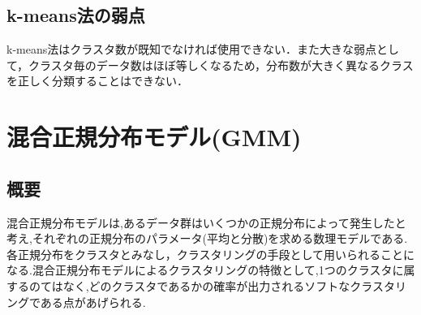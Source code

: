 \documentclass[a4j]{jsarticle}
\begin{document}
\subsection{k-means法の弱点}
k-means法はクラスタ数が既知でなければ使用できない．また大きな弱点として，クラスタ毎のデータ数はほぼ等しくなるため，分布数が大きく異なるクラスを正しく分類することはできない．


\section{混合正規分布モデル(GMM)}
\subsection{概要}
混合正規分布モデルは,あるデータ群はいくつかの正規分布によって発生したと考え,それぞれの正規分布のパラメータ(平均と分散)を求める数理モデルである.
各正規分布をクラスタとみなし，クラスタリングの手段として用いられることになる.混合正規分布モデルによるクラスタリングの特徴として,1つのクラスタに属するのてはなく,どのクラスタであるかの確率が出力されるソフトなクラスタリングである点があげられる.
\end{document}
